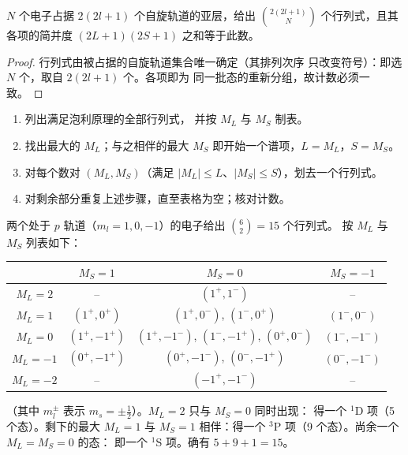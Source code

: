 \begin{proposition}[组态态数的计数]\label{prop:b3:many-electron-atoms:count}
$N$ 个电子占据 $2(2l+1)$ 个自旋轨道的亚层，给出
$\binom{2(2l+1)}{N}$ 个行列式，且其各项的简并度 $(2L+1)(2S+1)$
之和等于此数。
\end{proposition}

\begin{proof}
行列式由被占据的自旋轨道集合唯一确定（其排列次序
只改变符号）：即选 $N$ 个，取自 $2(2l+1)$ 个。各项即为
同一批态的重新分组，故计数必须一致。
\end{proof}

\begin{method}[组态的谱项]\label{met:b3:many-electron-atoms:terms}
\begin{enumerate}
  \item 列出满足泡利原理的全部行列式，
        并按 $M_L$ 与 $M_S$ 制表。
  \item 找出最大的 $M_L$；与之相伴的最大 $M_S$
        即开始一个谱项，$L = M_L$，$S = M_S$。
  \item 对每个数对 $(M_L, M_S)$（满足
        $|M_L| \le L$、$|M_S| \le S$），划去一个行列式。
  \item 对剩余部分重复上述步骤，直至表格为空；核对计数。
\end{enumerate}
\end{method}

\begin{example}[$p^2$ 的谱项]\label{ex:b3:many-electron-atoms:p2}
两个处于 $p$ 轨道（$m_l = 1, 0, -1$）的电子给出 $\binom62 = 15$ 个行列式。
按 $M_L$ 与 $M_S$ 列表如下：
\begin{center}\small
\begin{tabular}{c|ccc}
\hline
 & $M_S = 1$ & $M_S = 0$ & $M_S = -1$\\ \hline
$M_L = 2$ & -- & $(1^+,1^-)$ & --\\
$M_L = 1$ & $(1^+,0^+)$ & $(1^+,0^-)$, $(1^-,0^+)$ & $(1^-,0^-)$\\
$M_L = 0$ & $(1^+,-1^+)$ & $(1^+,-1^-)$, $(1^-,-1^+)$, $(0^+,0^-)$ & $(1^-,-1^-)$\\
$M_L = -1$ & $(0^+,-1^+)$ & $(0^+,-1^-)$, $(0^-,-1^+)$ & $(0^-,-1^-)$\\
$M_L = -2$ & -- & $(-1^+,-1^-)$ & --\\ \hline
\end{tabular}
\end{center}
（其中 $m_l^\pm$ 表示 $m_s = \pm\frac12$）。$M_L = 2$ 只与 $M_S = 0$ 同时出现：
得一个 ${}^1$D 项（5 个态）。剩下的最大 $M_L = 1$ 与
$M_S = 1$ 相伴：得一个 ${}^3$P 项（9 个态）。尚余一个 $M_L = M_S = 0$ 的态：
即一个 ${}^1$S 项。确有 $5 + 9 + 1 = 15$。
\end{example}

